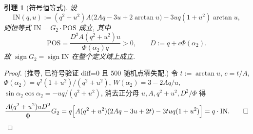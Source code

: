 \documentclass[UTF8]{ctexart}
\newtheorem{lemma}[theorem]{引理}
\begin{document}
\begin{lemma}[符号恒等式]
\label{lem:sign}
设
\begin{equation}
	\mathrm{IN}(q,u):=(q^2+u^2)A\bigl(2Aq-3u+2\arctan u\bigr)-3uq(1+u^2)\arctan u,
\end{equation}
则恒等式 $\mathrm{IN}=G_2\cdot\mathrm{POS}$ 成立, 其中
\begin{equation}
	\mathrm{POS}=\frac{D^2A(q^2+u^2)u}{\Phi(\alpha_2)q}>0,\qquad D:=q+c\Phi(\alpha_2).
\end{equation}
故 $\operatorname{sign}G_2=\operatorname{sign}\mathrm{IN}$ 在整个定义域上成立.
\end{lemma}
\begin{proof}
(推导, 已符号验证 diff=0 且 500 随机点零失配.) 令 $t:=\arctan u$, $c=t/A$,
$\Phi(\alpha_2)=q^2(1+u^2)/(q^2+u^2)$, $W(\alpha_2)=3-2Aq/u$,
$\sin\alpha_2\cos\alpha_2=-uq/(q^2+u^2)$, 消去正分母 $u,A,q^2+u^2,D^2/\Phi$ 得
\begin{equation}
	\frac{A(q^2+u^2)uD^2}{\Phi}G_2
	=q\Bigl[A(q^2+u^2)(2Aq-3u+2t)-3tuq(1+u^2)\Bigr]=q\cdot\mathrm{IN}.\qed
\end{equation}
\end{proof}
\end{document}
